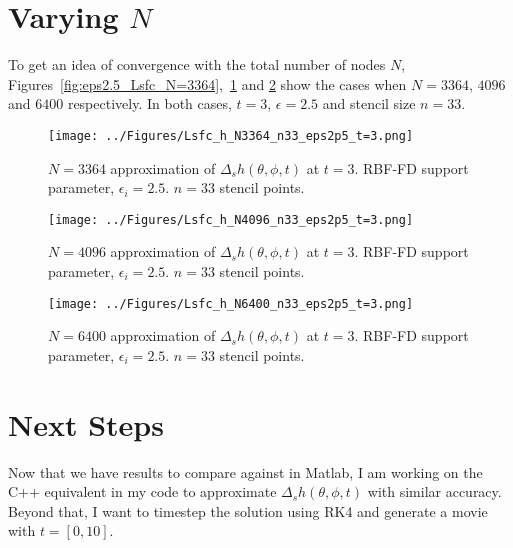 \documentclass[letter,10pt]{article}
\begin{document}
\clearpage

\section{Varying $N$} 

To get an idea of convergence with the total number of nodes $N$, Figures~\ref{fig:eps2.5_Lsfc_N=3364},~\ref{fig:eps2.5_Lsfc_N=4096} and \ref{fig:eps2.5_Lsfc_N=6400} show the cases when $N=3364$, $4096$ and $6400$ respectively. In both cases, $t=3$, $\epsilon=2.5$ and stencil size $n=33$.  

\begin{figure}[h]
\begin{center}
\texttt{[image: ../Figures/Lsfc\_h\_N3364\_n33\_eps2p5\_t=3.png]}
\caption{$N=3364$ approximation of $\Delta_{s} h(\theta,\phi,t)$ at $t=3$. RBF-FD support parameter, $\epsilon_{i}=2.5$. $n=33$ stencil points. }
\label{fig:eps2.5_Lsfc_N=3364}
\texttt{[image: ../Figures/Lsfc\_h\_N4096\_n33\_eps2p5\_t=3.png]}
\caption{$N=4096$ approximation of $\Delta_{s} h(\theta,\phi,t)$ at $t=3$. RBF-FD support parameter, $\epsilon_{i}=2.5$. $n=33$ stencil points. }
\label{fig:eps2.5_Lsfc_N=4096}
\end{center}
\end{figure}

\begin{figure}[h]
\begin{center}
\texttt{[image: ../Figures/Lsfc\_h\_N6400\_n33\_eps2p5\_t=3.png]}
\caption{$N=6400$ approximation of $\Delta_{s} h(\theta,\phi,t)$ at $t=3$. RBF-FD support parameter, $\epsilon_{i}=2.5$. $n=33$ stencil points. }
\label{fig:eps2.5_Lsfc_N=6400}
\end{center}
\end{figure}

\clearpage

\section{Next Steps}
Now that we have results to compare against in Matlab, I am working on the C++ equivalent in my code to approximate $\Delta_{s} h(\theta,\phi,t)$ with similar accuracy. Beyond that, I want to timestep the solution using RK4 and generate a movie with $t=[0,10]$. 
\end{document}
